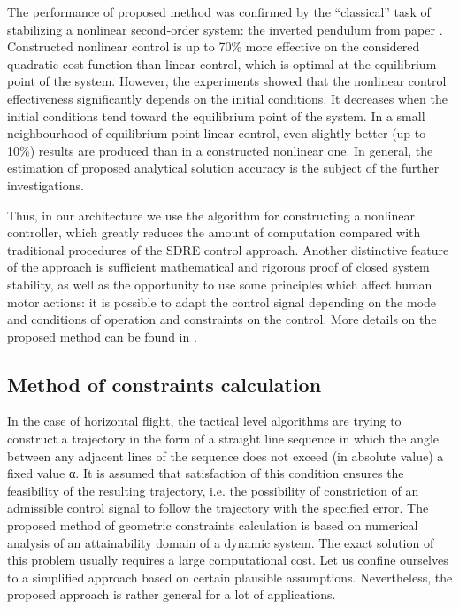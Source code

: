\documentclass[review]{elsarticle}
\begin{document}
The performance of proposed method was confirmed by the ``classical'' task of stabilizing a nonlinear second-order system: the inverted pendulum from paper \cite{Dutka2005}.  Constructed nonlinear control is up to 70\% more effective on the considered quadratic cost function than linear control, which is optimal at the equilibrium point of the system. However, the experiments showed that the nonlinear control effectiveness significantly depends on the initial conditions. It decreases when the initial conditions tend toward the equilibrium point of the system. In a small neighbourhood of equilibrium point linear control, even slightly better (up to 10\%) results are produced than in a constructed nonlinear one. In general, the estimation of proposed analytical solution accuracy is the subject of the further investigations.

Thus, in our architecture we use the algorithm for constructing a nonlinear controller, which greatly reduces the amount of computation compared with traditional procedures of the SDRE control approach. Another distinctive feature of the approach is sufficient mathematical and rigorous proof of closed system stability, as well as the opportunity to use some principles which affect human motor actions: it is possible to adapt the control signal depending on the mode and conditions of operation and constraints on the control. More details on the proposed method can be found in \cite{Dmitriev2014}.

\subsection{Method of constraints calculation}
In the case of horizontal flight, the tactical level algorithms are trying to construct a trajectory in the form of a straight line sequence in which the angle between any adjacent lines of the sequence does not exceed (in absolute value) a fixed value α. It is assumed that satisfaction of this condition ensures the feasibility of the resulting trajectory, i.e. the possibility of constriction of an admissible control signal to follow the trajectory with the specified error. The proposed method of geometric constraints calculation is based on numerical analysis of an attainability domain of a dynamic system. The exact solution of this problem usually requires a large computational cost. Let us confine ourselves to a simplified approach based on certain plausible assumptions. Nevertheless, the proposed approach is rather general for a lot of applications. 
\end{document}
